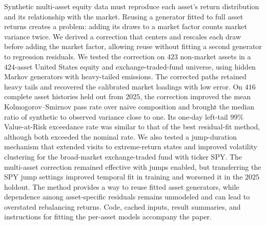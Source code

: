 Synthetic multi-asset equity data must reproduce each asset's return
distribution and its relationship with the market. Reusing a generator
fitted to full asset returns creates a problem: adding its draws to a
market factor counts market variance twice. We derived a correction
that centers and rescales each draw before adding the market factor,
allowing reuse without fitting a second generator to regression
residuals. We tested the correction on $423$ non-market assets in a
$424$-asset United States equity and exchange-traded-fund universe,
using hidden Markov generators with heavy-tailed emissions. The
corrected paths retained heavy tails and recovered the calibrated
market loadings with low error. On $416$ complete asset histories held
out from $2025$, the correction improved the mean Kolmogorov--Smirnov
pass rate over naive composition and brought the median ratio of
synthetic to observed variance close to one. Its one-day left-tail
$99\%$ Value-at-Risk exceedance rate was similar to that of the best
residual-fit method, although both exceeded the nominal rate. We also
tested a jump-duration mechanism that extended visits to extreme-return
states and improved volatility clustering for the broad-market
exchange-traded fund with ticker SPY. The multi-asset correction
remained effective with jumps enabled, but transferring the SPY jump
settings improved temporal fit in training and worsened it in the
$2025$ holdout. The method provides a way to reuse fitted asset
generators, while dependence among asset-specific residuals remains
unmodeled and can lead to overstated rebalancing returns. Code,
cached inputs, result summaries, and instructions for fitting the
per-asset models accompany the paper.
